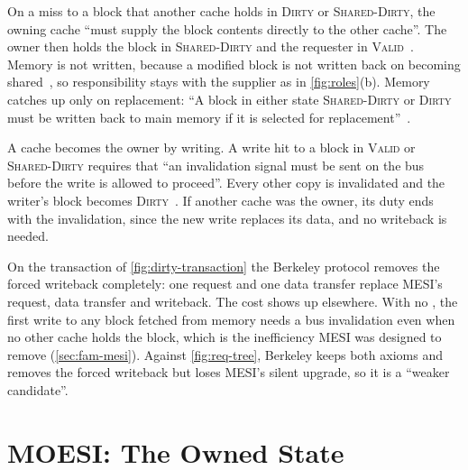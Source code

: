 On a miss to a block that another cache holds in \textsc{Dirty} or
\textsc{Shared-Dirty}, the owning cache ``must supply the block contents directly
to the other cache''. The owner then holds the block in \textsc{Shared-Dirty} and
the requester in \textsc{Valid}~\cite[p.~278]{archibald1986evaluation}. Memory is
not written, because a modified block is not written back on becoming
shared~\cite[p.~277]{archibald1986evaluation}, so responsibility stays with the
supplier as in \cref{fig:roles}(b). Memory catches up only on replacement: ``A
block in either state \textsc{Shared-Dirty} or \textsc{Dirty} must be written back
to main memory if it is selected for
replacement''~\cite[p.~277]{archibald1986evaluation}.

A cache becomes the owner by writing. A write hit to a block in \textsc{Valid} or
\textsc{Shared-Dirty} requires that ``an invalidation signal must be sent on the
bus before the write is allowed to proceed''. Every other copy is invalidated and
the writer's block becomes \textsc{Dirty}~\cite[p.~278]{archibald1986evaluation}.
If another cache was the owner, its duty ends with the invalidation, since the new
write replaces its data, and no writeback is needed.

On the transaction of \cref{fig:dirty-transaction} the Berkeley protocol removes
the forced writeback completely: one request and one data transfer replace MESI's
request, data transfer and writeback. The cost shows up elsewhere. With no \stE,
the first write to any block fetched from memory needs a bus invalidation even
when no other cache holds the block, which is the inefficiency MESI was designed
to remove (\cref{sec:fam-mesi}). Against \cref{fig:req-tree}, Berkeley keeps both
axioms and removes the forced writeback but loses MESI's silent upgrade, so it is
a ``weaker candidate''.

\section{MOESI: The Owned State}
\label{sec:own-moesi}
%

